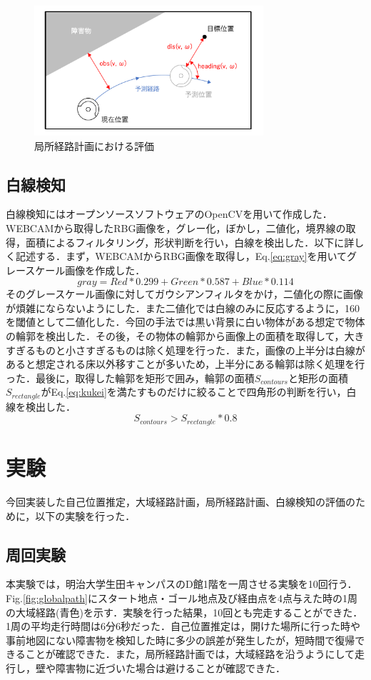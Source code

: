 \documentclass{jarticle}
\begin{document}
\begin{figure}
	\includegraphics[width=8.5cm]{./picture/DWA.png}
	\caption{局所経路計画における評価}
	\label{fig:DWA}
\end{figure}

\subsection{白線検知}
白線検知にはオープンソースソフトウェアのOpenCV\cite{opencv}を用いて作成した．WEBCAMから取得したRBG画像を，グレー化，ぼかし，二値化，境界線の取得，面積によるフィルタリング，形状判断を行い，白線を検出した．以下に詳しく記述する．まず，WEBCAMからRBG画像を取得し，Eq.\ref{eq:gray}を用いてグレースケール画像を作成した．
\begin{equation}
	gray = Red * 0.299 +  Green * 0.587 + Blue * 0.114
	\label{eq:gray}
\end{equation}
そのグレースケール画像に対してガウシアンフィルタをかけ，二値化の際に画像が煩雑にならないようにした．また二値化では白線のみに反応するように，160を閾値として二値化した．今回の手法では黒い背景に白い物体がある想定で物体の輪郭を検出した．その後，その物体の輪郭から画像上の面積を取得して，大きすぎるものと小さすぎるものは除く処理を行った．また，画像の上半分は白線があると想定される床以外移すことが多いため，上半分にある輪郭は除く処理を行った．最後に，取得した輪郭を矩形で囲み，輪郭の面積$S_{contours}$と矩形の面積$S_{rectangle}$がEq.\ref{eq:kukei}を満たすものだけに絞ることで四角形の判断を行い，白線を検出した．
\vspace{-3mm}
\begin{equation}
	S_{contours} > S_{rectangle} * 0.8
	\label{eq:kukei}
\end{equation}
\section{実験}
今回実装した自己位置推定，大域経路計画，局所経路計画、白線検知の評価のために，以下の実験を行った．
\subsection{周回実験}
本実験では，明治大学生田キャンパスのD館1階を一周させる実験を10回行う．Fig.\ref{fig:globalpath}にスタート地点・ゴール地点及び経由点を4点与えた時の1周の大域経路(青色)を示す．実験を行った結果，10回とも完走することができた．1周の平均走行時間は6分6秒だった．自己位置推定は，開けた場所に行った時や事前地図にない障害物を検知した時に多少の誤差が発生したが，短時間で復帰できることが確認できた．また，局所経路計画では，大域経路を沿うようにして走行し，壁や障害物に近づいた場合は避けることが確認できた．
\end{document}
